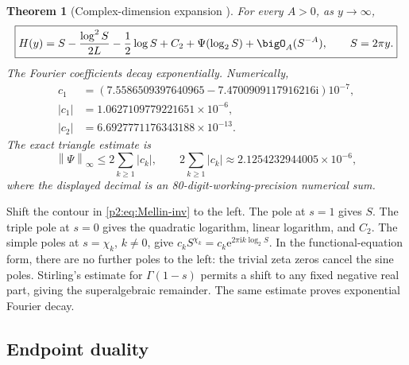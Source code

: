 \documentclass[11pt]{article}
\numberwithin{equation}{section}
\newtheorem{theorem}{Theorem}[section]
\theoremstyle{definition}
\theoremstyle{remark}
\newcommand{\e}{\mathrm e}
\newcommand{\ii}{\mathrm i}
\newcommand{\norm}[1]{\left\lVert#1\right\rVert}
\begin{document}
\begin{theorem}[Complex-dimension expansion \NewResult]
\label{p2:thm:H-asymp}
For every $A>0$, as $y\to\infty$,
\begin{equation}
 \boxed{
 H(y)=S-\frac{\log^2S}{2L}-\frac12\log S+C_2
      +\Psi(\log_2S)+\bigO_A(S^{-A}),\qquad S=2\pi y.}    \label{p2:eq:H-asymp}
\end{equation}
The Fourier coefficients decay exponentially.  Numerically,
\begin{align}
 c_1&=(7.5586509397640965-7.4700909117916216\ii)10^{-7},\nonumber\\
 |c_1|&=1.0627109779221651\times10^{-6},\nonumber\\
 |c_2|&=6.6927771176343188\times10^{-13}.                 \label{p2:eq:cnum}
\end{align}
The exact triangle estimate is
\begin{equation}
 \norm{\Psi}_\infty\le2\sum_{k\ge1}|c_k|,
 \qquad
 2\sum_{k\ge1}|c_k|\approx2.1254232944005\times10^{-6}, \label{p2:eq:Psi-bound}
\end{equation}
where the displayed decimal is an 80-digit-working-precision numerical sum.
\end{theorem}

\begin{proofidea}
Shift the contour in \eqref{p2:eq:Mellin-inv} to the left.  The pole at $s=1$
gives $S$.  The triple pole at $s=0$ gives the quadratic logarithm, linear
logarithm, and $C_2$.  The simple poles at $s=\chi_k$, $k\ne0$, give
$c_kS^{\chi_k}=c_k\e^{2\pi\ii k\log_2S}$.  In the functional-equation form,
there are no further poles to the left: the trivial zeta zeros cancel the sine
poles.  Stirling's estimate for $\Gamma(1-s)$ permits a shift to any fixed
negative real part, giving the superalgebraic remainder.  The same estimate
proves exponential Fourier decay.
\end{proofidea}

\subsection{Endpoint duality}
\end{document}
